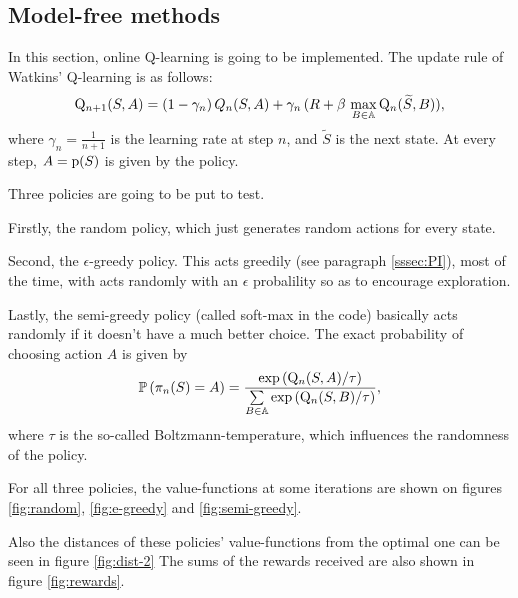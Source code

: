 
\subsection{Model-free methods}

In this section, online Q-learning is going to be implemented.
The update rule of Watkins' Q-learning is as follows:
\begin{equation}
	\mathrm{Q}_{n+1}(S,A)=(1-\gamma_n)\,Q_n(S, A) + \gamma_n\,(R + \beta\,\max\limits_{B\in\mathbb{A}}\mathrm{Q}_n(\widetilde{S},B)),
\end{equation}
where $\gamma_n=\frac{1}{n+1}$ is the learning rate at step $n$, and $\widetilde{S}$ is the next state.
At every step, $A=\mathrm{p}(S)$ is given by the policy.

Three policies are going to be put to test.

Firstly, the random policy, which just generates random actions for every state.

Second, the $\epsilon$-greedy policy. This acts greedily (see paragraph \ref{sssec:PI}),
most of the time, with acts randomly with an $\epsilon$ probalility so as to
encourage exploration.

Lastly, the semi-greedy policy (called soft-max in the code) basically acts randomly
if it doesn't have a much better choice. The exact probability of choosing action $A$
is given by
\begin{equation}
	\mathbb{P}\left(\pi_n(S)=A\right) =
	\frac{\exp\left(\mathrm{Q}_n(S, A)/\tau\right)}
	{\sum\limits_{B\in\mathbb{A}}\exp\left(\mathrm{Q}_n(S, B)/\tau\right)},
\end{equation}
where $\tau$ is the so-called Boltzmann-temperature, which influences
the randomness of the policy.

For all three policies, the value-functions at some iterations are shown
on figures \ref{fig:random}, \ref{fig:e-greedy} and \ref{fig:semi-greedy}.

Also the distances of these policies' value-functions from the optimal one
can be seen in figure \ref{fig:dist-2}
The sums of the rewards received are also shown in figure \ref{fig:rewards}.

